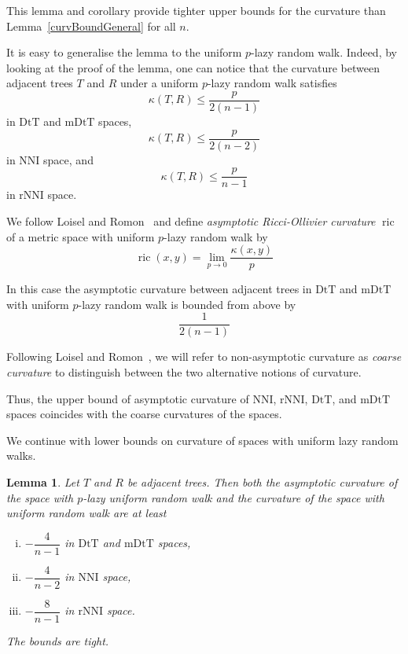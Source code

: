 \documentclass{amsart}
\newtheorem{lemma}{Lemma}
\newcommand{\dts}{\mathrm{DtT}}
\newcommand{\nni}{\mathrm{NNI}}
\newcommand{\rnni}{\mathrm{rNNI}}
\newcommand{\mdts}{\mathrm{mDtT}}
\newcommand{\ric}{\operatorname{ric}}
\begin{document}
This lemma and corollary provide tighter upper bounds for the curvature than Lemma~\ref{curvBoundGeneral} for all $n$.

It is easy to generalise the lemma to the uniform $p$-lazy random walk.
Indeed, by looking at the proof of the lemma, one can notice that the curvature between adjacent trees $T$ and $R$ under a uniform $p$-lazy random walk satisfies
\[
\kappa(T,R) \leq \frac{p}{2(n-1)}
\]
in $\dts$ and $\mdts$ spaces,
\[
\kappa(T,R) \leq \frac{p}{2(n-2)}
\]
in $\nni$ space, and
\[
\kappa(T,R) \leq \frac{p}{n-1}
\]
in $\rnni$ space.


We follow Loisel and Romon~\cite{Loisel2014-gu} and define  {\em asymptotic Ricci-Ollivier curvature} $\ric$ of a metric space with uniform $p$-lazy random walk by 
\[
\ric(x,y) = \lim_{p\to0} \frac{\kappa(x,y)}{p}
\]

In this case the asymptotic curvature between adjacent trees in $\dts$ and $\mdts$ with uniform $p$-lazy random walk is bounded from above by
\[
\frac{1}{2(n-1)}
\]

Following Loisel and Romon~\cite{Loisel2014-gu}, we will refer to non-asymptotic curvature as {\em coarse curvature} to distinguish between the two alternative notions of curvature.


Thus, the upper bound of asymptotic curvature of $\nni$, $\rnni$, $\dts$, and $\mdts$ spaces coincides with the coarse curvatures of the spaces.

We continue with lower bounds on curvature of spaces with uniform lazy random walks.

\begin{lemma}\label{uniformLower}
Let $T$ and $R$ be adjacent trees.
Then both the asymptotic curvature of the space with $p$-lazy uniform random walk and the curvature of the space with uniform random walk are at least 
\begin{enumerate}[(i)]
\item $-\dfrac{4}{n-1}$ in $\dts$ and $\mdts$ spaces,
\item $-\dfrac{4}{n-2}$ in $\nni$ space,
\item $-\dfrac{8}{n-1}$ in $\rnni$ space. 
\end{enumerate}

The bounds are tight.
\end{lemma}
\end{document}
